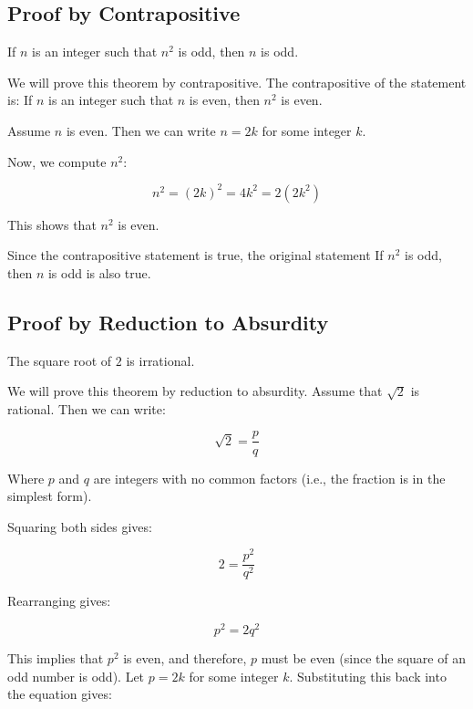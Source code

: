 \subsection{Proof by Contrapositive}

If \( n \) is an integer such that \( n^2 \) is odd, then \( n \) is odd.
\vspace{\baselineskip}

We will prove this theorem by contrapositive. The contrapositive of the statement is: If \( n \) is an integer such that \( n \) is even, then \( n^2 \) is even.
\vspace{\baselineskip}

Assume \( n \) is even. Then we can write \( n = 2k \) for some integer \( k \).
\vspace{\baselineskip}

Now, we compute \( n^2 \):
	
\[
	n^2 = {(2k)}^2 = 4k^2 = 2(2k^2)
\]

This shows that \( n^2 \) is even.
\vspace{\baselineskip}

Since the contrapositive statement is true, the original statement If \( n^2 \) is odd, then \( n \) is odd is also true.

\QED

\subsection{Proof by Reduction to Absurdity}

The square root of \( 2 \) is irrational.
\vspace{\baselineskip}

We will prove this theorem by reduction to absurdity. Assume that \( \sqrt{2} \) is rational. Then we can write:

\[
	\sqrt{2} = \frac{p}{q}
\]

Where \( p \) and \( q \) are integers with no common factors (i.e., the fraction is in the simplest form).
\vspace{\baselineskip}

Squaring both sides gives:

\[
	2 = \frac{p^2}{q^2}
\]
	
Rearranging gives:

\[
	p^2 = 2q^2
\]
	
This implies that \( p^2 \) is even, and therefore, \( p \) must be even (since the square of an odd number is odd).
Let \( p = 2k \) for some integer \( k \). Substituting this back into the equation gives:

